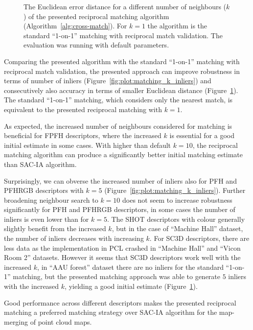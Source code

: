 \begin{figure}
  \centering
  
  \caption[The Euclidean distance per $k$ in the reciprocal matching algorithm]{The Euclidean error distance for a different number of neighbours ($k$) of the presented reciprocal matching algorithm (Algorithm~\ref{alg:cross-match}). For $k=1$ the algorithm is the standard ``1-on-1'' matching with reciprocal match validation. The evaluation was running with default parameters.}
  \label{fig:plot:matching_k_dist}
\end{figure}

Comparing the presented algorithm with the standard ``1-on-1'' matching with reciprocal match validation, the presented approach can improve robustness in terms of number of inliers (Figure~\ref{fig:plot:matching_k_inliers}) and consecutively also accuracy in terms of smaller Euclidean distance (Figure~\ref{fig:plot:matching_k_dist}). The standard ``1-on-1'' matching, which considers only the nearest match, is equivalent to the presented reciprocal matching with $k=1$.

As expected, the increased number of neighbours considered for matching is beneficial for \gls{FPFH} descriptors, where the increased $k$ is essential for a good initial estimate in some cases. With higher than default $k=10$, the reciprocal matching algorithm can produce a significantly better initial matching estimate than \gls{SAC-IA} algorithm.

Surprisingly, we can obverse the increased number of inliers also for \gls{PFH} and \gls{PFHRGB} descriptors with $k=5$ (Figure~\ref{fig:plot:matching_k_inliers}). Further broadening neighbour search to $k=10$ does not seem to increase robustness significantly for \gls{PFH} and \gls{PFHRGB} descriptors, in some cases the number of inliers is even lower than for $k=5$. The \gls{SHOT} descriptors with colour generally slightly benefit from the increased $k$, but in the case of ``Machine Hall'' dataset, the number of inliers decreases with increasing $k$. For \gls{SC3D} descriptors, there are less data as the implementation in \gls{PCL} crashed in ``Machine Hall'' and ``Vicon Room 2'' datasets. However it seems that \gls{SC3D} descriptors work well with the increased $k$, in ``AAU forest'' dataset there are no inliers for the standard ``1-on-1'' matching, but the presented matching approach was able to generate $5$ inliers with the increased $k$, yielding a good initial estimate (Figure~\ref{fig:plot:matching_k_dist}).

Good performance across different descriptors makes the presented reciprocal matching a preferred matching strategy over \gls{SAC-IA} algorithm for the map-merging of point cloud maps.


